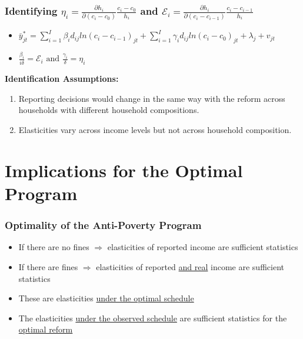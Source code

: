 \documentclass[xcolor=pdftex,dvipsnames,table]{beamer}
\begin{document}
\begin{frame}[label = empirical_relation]
\frametitle{Identifying $\eta_i=\frac{\partial h_i}{\partial(c_i-c_0)}\frac{c_i-c_0}{h_i}$ and $\mathcal{E}_i=\frac{\partial h_i}{\partial(c_i-c_{i-1})}\frac{c_i-c_{i-1}}{h_i}$}
\begin{itemize}
\item $\bar{y}^*_{jt}=\sum_{i=1}^I \beta_i d_{ij}ln(c_i-c_{i-1})_{jt}+\sum_{i=1}^I \gamma_i d_{ij}ln(c_i-c_{0})_{jt}+\lambda_j+v_{jt}$\\
\pause
\item $\frac{\beta_i}{i\delta}=\mathcal{E}_i\text{ and }\frac{\gamma_i}{\delta}=\eta_i$
\end{itemize}
\hyperlink{proof_empirical}{}
\pause
\begin{block}

\textbf{Identification Assumptions:} 
\begin{enumerate}
\item Reporting decisions would change in the same way with the reform across households with different household compositions.
\item Elasticities vary across income levels but not across household composition.
\end{enumerate}
\end{block}
\end{frame}



\section{Implications for the Optimal Program}

\begin{frame}[label=implications]
\frametitle{Optimality of the Anti-Poverty Program}
\begin{itemize}
\pause
\item If there are no fines $\Rightarrow$ elasticities of reported income are sufficient statistics
\pause
\item If there are fines $\Rightarrow$ elasticities of reported \underline{and real} income are sufficient statistics
\pause
\item These are elasticities \underline{under the optimal schedule}
\pause
\item The elasticities \underline{under the observed schedule} are sufficient statistics for the \underline{optimal reform}
\end{itemize}
\hyperlink{theory}{}
\hyperlink{imp}{}
\hyperlink{prop_imp}{}
\hyperlink{reform}{}
\end{frame}
\end{document}
